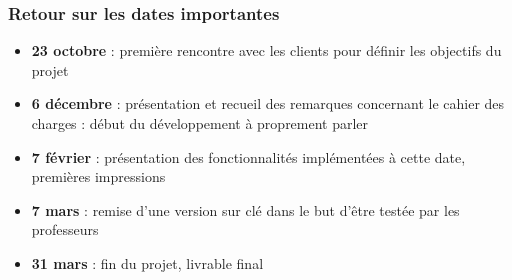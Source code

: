 \begin{frame}
\frametitle{Retour sur les dates importantes}
\begin{itemize}
\item \textbf{23 octobre} : première rencontre avec les clients pour définir les objectifs du projet
\item \textbf{6 décembre} : présentation et recueil des remarques concernant le cahier des charges : début du développement à proprement parler
\item \textbf{7 février} : présentation des fonctionnalités implémentées à cette date, premières impressions
\item \textbf{7 mars} : remise d'une version sur clé dans le but d'être testée par les professeurs
\item \textbf{31 mars} : fin du projet, livrable final
\end{itemize}
\end{frame}